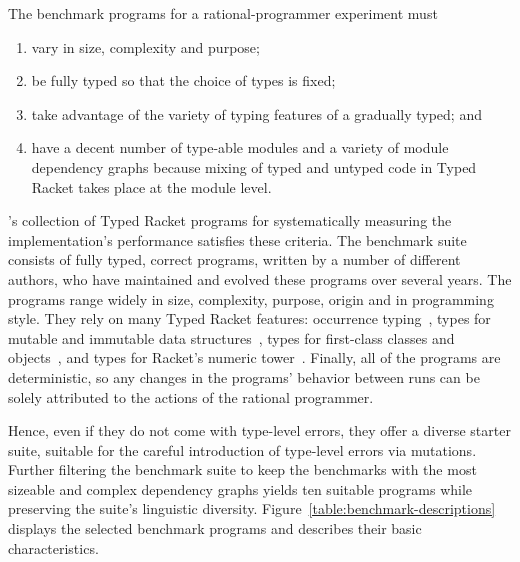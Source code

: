 
The benchmark programs for a rational-programmer experiment must 
\begin{enumerate}
   
\item vary in size, complexity and purpose;

\item be fully typed so that the choice of types is fixed; 
    
\item take advantage of the variety of typing features of a gradually
typed; and

\item have a decent number of type-able modules and a variety of module dependency graphs
 because mixing of typed and untyped code in Typed Racket takes place at the
 module level. 

\end{enumerate}

\citet{gtnffvf-jfp-2019}'s collection of Typed Racket programs for
systematically measuring the implementation's performance satisfies these
criteria. The benchmark suite consists of fully typed, correct programs, written
by a number of different authors, who have maintained and evolved these programs
over several years. The programs range widely in size, complexity, purpose,
origin and in programming style. They rely on many Typed Racket features:
occurrence typing~\citep{tf-icfp-2010}, types for mutable and immutable data
structures~\citep{hpst-sfp-2010}, types for first-class classes and
objects~\citep{tsdtf-oopsla-2012}, and types for Racket's numeric
tower~\citep{stathff-padl-12}.  Finally, all of the programs are deterministic,
so any changes in the programs' behavior between runs can be solely attributed
to the actions of the rational programmer.

Hence, even if they do not come with type-level errors, they offer a diverse
starter suite, suitable for the careful introduction of type-level errors via
mutations. Further filtering the benchmark suite to keep the benchmarks with the
most sizeable and complex dependency graphs yields ten suitable programs while
preserving the suite's linguistic diversity. Figure~\ref{table:benchmark-descriptions} displays the selected
benchmark programs and describes their basic characteristics.
